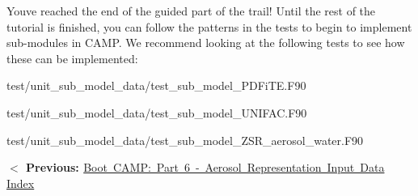 You\textquotesingle{}ve reached the end of the guided part of the trail! Until the rest of the tutorial is finished, you can follow the patterns in the tests to begin to implement sub-\/modules in CAMP. We recommend looking at the following tests to see how these can be implemented\+:


\begin{DoxyItemize}
\item {\ttfamily test/unit\+\_\+sub\+\_\+model\+\_\+data/test\+\_\+sub\+\_\+model\+\_\+\+PDFi\+TE.\+F90}
\item {\ttfamily test/unit\+\_\+sub\+\_\+model\+\_\+data/test\+\_\+sub\+\_\+model\+\_\+\+UNIFAC.\+F90}
\item {\ttfamily test/unit\+\_\+sub\+\_\+model\+\_\+data/test\+\_\+sub\+\_\+model\+\_\+\+ZSR\+\_\+aerosol\+\_\+water.\+F90}
\end{DoxyItemize}

 {\bfseries{ $<$ Previous\+: }} \mbox{\hyperlink{camp_tutorial_part_6}{Boot CAMP\+: Part 6 -\/ Aerosol Representation Input Data}}  \mbox{\hyperlink{camp_tutorial}{Index}}  